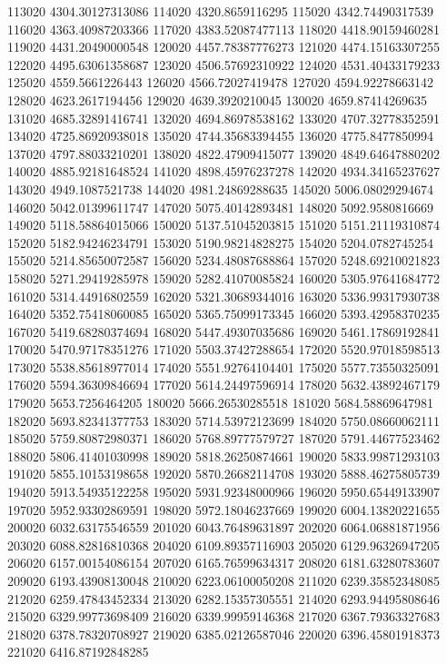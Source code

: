 {113020 4304.30127313086
114020 4320.8659116295
115020 4342.74490317539
116020 4363.40987203366
117020 4383.52087477113
118020 4418.90159460281
119020 4431.20490000548
120020 4457.78387776273
121020 4474.15163307255
122020 4495.63061358687
123020 4506.57692310922
124020 4531.40433179233
125020 4559.5661226443
126020 4566.72027419478
127020 4594.92278663142
128020 4623.2617194456
129020 4639.3920210045
130020 4659.87414269635
131020 4685.32891416741
132020 4694.86978538162
133020 4707.32778352591
134020 4725.86920938018
135020 4744.35683394455
136020 4775.8477850994
137020 4797.88033210201
138020 4822.47909415077
139020 4849.64647880202
140020 4885.92181648524
141020 4898.45976237278
142020 4934.34165237627
143020 4949.1087521738
144020 4981.24869288635
145020 5006.08029294674
146020 5042.01399611747
147020 5075.40142893481
148020 5092.9580816669
149020 5118.58864015066
150020 5137.51045203815
151020 5151.21119310874
152020 5182.94246234791
153020 5190.98214828275
154020 5204.0782745254
155020 5214.85650072587
156020 5234.48087688864
157020 5248.69210021823
158020 5271.29419285978
159020 5282.41070085824
160020 5305.97641684772
161020 5314.44916802559
162020 5321.30689344016
163020 5336.99317930738
164020 5352.75418060085
165020 5365.75099173345
166020 5393.42958370235
167020 5419.68280374694
168020 5447.49307035686
169020 5461.17869192841
170020 5470.97178351276
171020 5503.37427288654
172020 5520.97018598513
173020 5538.85618977014
174020 5551.92764104401
175020 5577.73550325091
176020 5594.36309846694
177020 5614.24497596914
178020 5632.43892467179
179020 5653.7256464205
180020 5666.26530285518
181020 5684.58869647981
182020 5693.82341377753
183020 5714.53972123699
184020 5750.08660062111
185020 5759.80872980371
186020 5768.89777579727
187020 5791.44677523462
188020 5806.41401030998
189020 5818.26250874661
190020 5833.99871293103
191020 5855.10153198658
192020 5870.26682114708
193020 5888.46275805739
194020 5913.54935122258
195020 5931.92348000966
196020 5950.65449133907
197020 5952.93302869591
198020 5972.18046237669
199020 6004.13820221655
200020 6032.63175546559
201020 6043.76489631897
202020 6064.06881871956
203020 6088.82816810368
204020 6109.89357116903
205020 6129.96326947205
206020 6157.00154086154
207020 6165.76599634317
208020 6181.63280783607
209020 6193.43908130048
210020 6223.06100050208
211020 6239.35852348085
212020 6259.47843452334
213020 6282.15357305551
214020 6293.94495808646
215020 6329.99773698409
216020 6339.99959146368
217020 6367.79363327683
218020 6378.78320708927
219020 6385.02126587046
220020 6396.45801918373
221020 6416.87192848285
}
